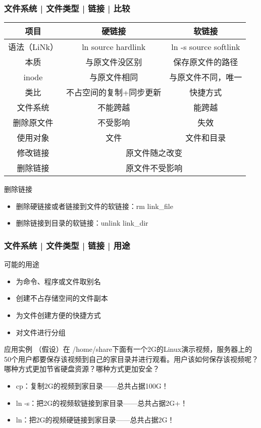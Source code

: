 \begin{frame}
  \frametitle{文件系统 | 文件类型 | 链接 | \alert{比较}}
  \begin{table}
    \centering
    \begin{tabularx}{0.94\textwidth}{ccc}
      \hline
      \rowcolor{blue!50}项目 & 硬链接 & 软链接\\
      \hline
      语法（LiNk） & ln source hardlink & ln -s source softlink\\
      本质 & 与原文件没区别 & 保存原文件的路径\\
      inode & 与原文件相同 & 与原文件不同，唯一\\
      类比 & 不占空间的复制+同步更新 & 快捷方式\\
      文件系统 & 不能跨越 & 能跨越\\
      删除原文件 & 不受影响 & 失效\\
      使用对象 & 文件 & 文件和目录\\
      \hline
      修改链接 & \multicolumn{2}{c}{原文件随之改变}\\
      删除链接 & \multicolumn{2}{c}{原文件不受影响}\\
      \hline
    \end{tabularx}
  \end{table}
  \pause
  \begin{block}{删除链接}
    \begin{itemize}
      \item 删除硬链接或者链接到文件的软链接：rm link\_file
      \item 删除链接到目录的软链接：unlink link\_dir
    \end{itemize}
  \end{block}
\end{frame}

\begin{frame}
  \frametitle{文件系统 | 文件类型 | 链接 | 用途}
  \begin{block}{可能的用途}
  \begin{itemize}
    \item 为命令、程序或文件取别名
    \item 创建不占存储空间的文件副本
    \item 为文件创建方便的快捷方式
    \item 对文件进行分组
  \end{itemize}
  \end{block}
  \pause
  \begin{block}{应用实例}
    （假设）在 /home/share下面有一个2G的Linux演示视频，服务器上的50个用户都要保存该视频到自己的家目录并进行观看。用户该如何保存该视频呢？哪种方式更加节省硬盘资源？哪种方式更加安全？
    \begin{itemize}
      \item cp：复制2G的视频到家目录——总共占据100G！
      \item ln -s：把2G的视频软链接到家目录——总共占据2G+！
      \item ln：把2G的视频硬链接到家目录——总共占据2G！
    \end{itemize}
  \end{block}
\end{frame}

